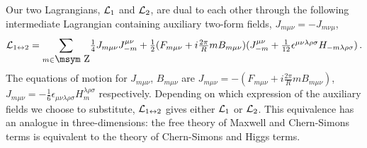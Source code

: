 \documentclass[a4paper,12pt]{article}
\def\Integer{{\mathop{\hbox{\msym \char  '132}}}}
\def\L{{\cal L}}
\def\pr{{\textstyle{\frac{2\pi}{R}}}}
\begin{document}
Our two  Lagrangians, $\L_{1}$ and $\L_{2}$,  are dual to each other through the following   intermediate Lagrangian containing auxiliary two-form fields, $J_{m\mu\nu}=-J_{m\nu\mu}$,
\begin{equation}
\L_{1\leftrightarrow 2}=\displaystyle{\sum_{m\in\Integer}}\textstyle{\frac{1}{4}}J_{m\mu\nu}J^{\mu\nu}_{-m}+\textstyle{\frac{1}{2}}(F_{m\mu\nu}+i\pr mB_{m\mu\nu})(J_{-m}^{\mu\nu}+\textstyle{\frac{1}{12}}
\epsilon^{\mu\nu\lambda\rho\sigma}H_{-m\lambda\rho\sigma})\,.
\end{equation}
The equations of motion for $J_{m\mu\nu}$,  $B_{m\mu\nu}$ are  $J_{m\mu\nu}=-(F_{m\mu\nu}+i\pr mB_{m\mu\nu})$,  $J_{m\mu\nu}=-\textstyle{\frac{1}{6}}\epsilon_{\mu\nu\lambda\rho\sigma}H_{m}^{\lambda\rho\sigma}$ respectively. Depending on which expression  of the auxiliary fields  we choose to substitute,  $\L_{1\leftrightarrow 2}$ gives either  $\L_{1}$ or $\L_{2}$.  This equivalence has an analogue in three-dimensions: the free theory of Maxwell and Chern-Simons terms is equivalent to the theory of Chern-Simons and Higgs terms.







\end{document}

